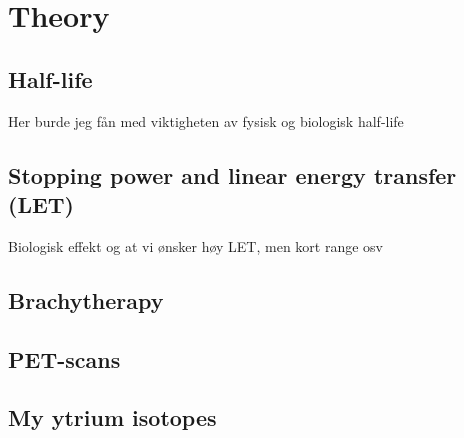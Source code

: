 \chapter{Theory}
\label{theory}
\section{Half-life}
Her burde jeg fån med viktigheten av fysisk og biologisk half-life

\section{Stopping power and linear energy transfer (LET)}
Biologisk effekt og at vi ønsker høy LET, men kort range osv

\section{Brachytherapy}
\section{PET-scans}
\section{My ytrium isotopes}


